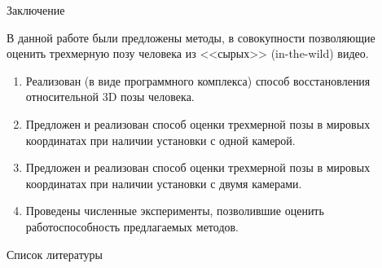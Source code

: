\documentclass[9pt,aspectratio=169]{beamer}
\begin{document}
\begin{frame}{Заключение}

В данной работе были предложены методы, в совокупности
позволяющие оценить трехмерную позу человека из <<сырых>>
(in-the-wild) видео.

\begin{enumerate}

\item Реализован (в виде программного комплекса) способ
восстановления относительной 3D позы человека.

\item Предложен и реализован способ оценки трехмерной позы в мировых координатах
при наличии установки с одной камерой.

\item Предложен и реализован способ оценки трехмерной позы в мировых координатах
при наличии установки с двумя камерами.

\item Проведены численные эксперименты, позволившие оценить работоспособность
предлагаемых методов.

\end{enumerate}

\end{frame}



\begin{frame}[allowframebreaks]{Список литературы}
\nocite{*}
\printbibliography[filter=russianonly, resetnumbers=false, heading=none]

\printbibliography[filter=englishonly, resetnumbers=false, heading=none]

\printbibliography[filter=links, resetnumbers=false, heading=none]

\end{frame}
\end{document}
